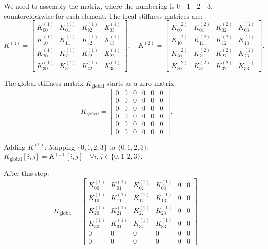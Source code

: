 \documentclass{book}
\begin{document}
We need to assembly the matrix, where the numbering is 0 - 1 - 2 - 3, counterclockwise for each element. The local stiffness matrices are:
\[
K^{(1)} = 
\begin{bmatrix}
K^{(1)}_{00} & K^{(1)}_{01} & K^{(1)}_{02} & K^{(1)}_{03} \\
K^{(1)}_{10} & K^{(1)}_{11} & K^{(1)}_{12} & K^{(1)}_{13} \\
K^{(1)}_{20} & K^{(1)}_{21} & K^{(1)}_{22} & K^{(1)}_{23} \\
K^{(1)}_{30} & K^{(1)}_{31} & K^{(1)}_{32} & K^{(1)}_{33}
\end{bmatrix},
\quad
K^{(2)} = 
\begin{bmatrix}
K^{(2)}_{00} & K^{(2)}_{01} & K^{(2)}_{02} & K^{(2)}_{03} \\
K^{(2)}_{10} & K^{(2)}_{11} & K^{(2)}_{12} & K^{(2)}_{13} \\
K^{(2)}_{20} & K^{(2)}_{21} & K^{(2)}_{22} & K^{(2)}_{23} \\
K^{(2)}_{30} & K^{(2)}_{31} & K^{(2)}_{32} & K^{(2)}_{33}
\end{bmatrix}.
\]

The global stiffness matrix $K_{\text{global}}$ starts as a zero matrix:
\[
K_{\text{global}} = 
\begin{bmatrix}
0 & 0 & 0 & 0 & 0 & 0 \\
0 & 0 & 0 & 0 & 0 & 0 \\
0 & 0 & 0 & 0 & 0 & 0 \\
0 & 0 & 0 & 0 & 0 & 0 \\
0 & 0 & 0 & 0 & 0 & 0 \\
0 & 0 & 0 & 0 & 0 & 0
\end{bmatrix}.
\]

Adding $K^{(1)}$: Mapping $\{0, 1, 2, 3\}$ to $\{0, 1, 2, 3\}$:
$K_{\text{global}}[i, j] = K^{(1)}[i, j] \quad \forall i, j \in \{0, 1, 2, 3\}$.

After this step:
\[
K_{\text{global}} =
    \begin{bmatrix}
        K^{(1)}_{00} & K^{(1)}_{01} & K^{(1)}_{02} & K^{(1)}_{03} & 0 & 0 \\
        K^{(1)}_{10} & K^{(1)}_{11} & K^{(1)}_{12} & K^{(1)}_{13} & 0 & 0 \\
        K^{(1)}_{20} & K^{(1)}_{21} & K^{(1)}_{22} & K^{(1)}_{23} & 0 & 0 \\
        K^{(1)}_{30} & K^{(1)}_{31} & K^{(1)}_{32} & K^{(1)}_{33} & 0 & 0 \\
        0 & 0 & 0 & 0 & 0 & 0 \\
        0 & 0 & 0 & 0 & 0 & 0
    \end{bmatrix}.
\]
\end{document}
